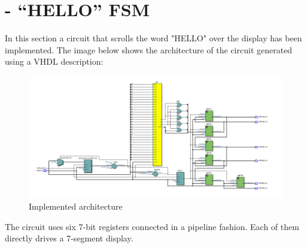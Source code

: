 \documentclass[12pt]{article}
\begin{document}
\newpage

\section{}
\section{}
\section{}
\newpage
\section{- “HELLO” FSM}
In this section a circuit that scrolls the word "HELLO" over the display has been implemented.
The image below shows the architecture of the circuit generated using a VHDL description:

\begin{figure}[h]
	\centering
	\includegraphics[scale = 0.47]{immagini/niki/rtl.PNG}
	\caption{Implemented architecture}
\end{figure}

The circuit uses six 7-bit registers connected in a pipeline fashion. Each of them directly drives a 7-segment display. 
\end{document}
